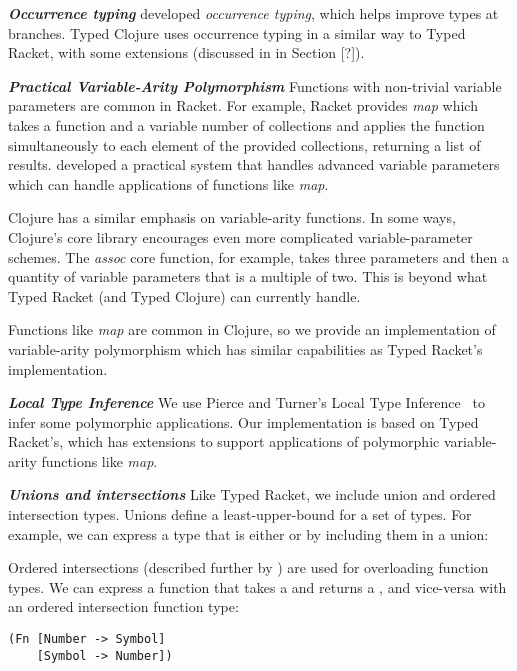\documentclass[preprint,10pt]{sigplanconf}
\newcommand\smallsection[1]{\bf \emph{#1}}
\begin{document}
{\smallsection {Occurrence typing}}
\citet{TF08,TF10} developed \emph{occurrence typing}, which helps improve types at branches.
Typed Clojure uses occurrence typing in a similar way to Typed Racket, with
some extensions (discussed in in Section [?]). %

{\smallsection {Practical Variable-Arity Polymorphism}}
Functions with non-trivial variable parameters are common in Racket.
For example, Racket provides \emph{map} which takes a function and a
variable number of collections and applies the function simultaneously
to each element of the provided collections, returning a list of results.
\citet*{STF09} developed a practical system that handles advanced variable parameters
which can handle applications of functions like \emph{map}.

Clojure has a similar emphasis on variable-arity functions. In some ways,
Clojure's core library encourages even more complicated variable-parameter schemes.
The \emph{assoc} core function, for example, takes three parameters and
then a quantity of variable parameters that is a multiple of two.
This is beyond what Typed Racket (and Typed Clojure) can currently handle. 

Functions like \emph{map} are common in Clojure, so we provide an implementation
of variable-arity polymorphism which has similar capabilities as Typed Racket's
implementation.

{\smallsection {Local Type Inference}}
We use Pierce and Turner's Local Type Inference~\cite{PT00} to infer some polymorphic
applications. Our implementation is based on Typed Racket's, which has extensions
to support applications of polymorphic variable-arity functions like \emph{map}.

{\smallsection {Unions and intersections}}
Like Typed Racket, we include union and ordered intersection types. Unions define
a least-upper-bound for a set of types. For example, we can express a type that is
either \Number or \Symbol by including them in a union: {\Union {\Number} {\Symbol}}

Ordered intersections (described further by \citet{SA+12})
are used for overloading function types. We can express a function that takes
a \Number and returns a \Symbol, and vice-versa with an ordered intersection function type:

\begin{lstlisting}[label=lst:ordered]
(Fn [Number -> Symbol]
    [Symbol -> Number])
\end{lstlisting}
\end{document}
